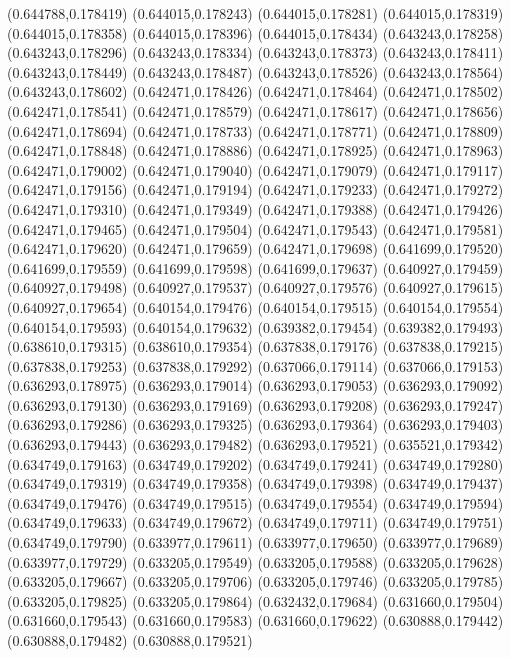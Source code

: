 (0.644788,0.178419)
(0.644015,0.178243)
(0.644015,0.178281)
(0.644015,0.178319)
(0.644015,0.178358)
(0.644015,0.178396)
(0.644015,0.178434)
(0.643243,0.178258)
(0.643243,0.178296)
(0.643243,0.178334)
(0.643243,0.178373)
(0.643243,0.178411)
(0.643243,0.178449)
(0.643243,0.178487)
(0.643243,0.178526)
(0.643243,0.178564)
(0.643243,0.178602)
(0.642471,0.178426)
(0.642471,0.178464)
(0.642471,0.178502)
(0.642471,0.178541)
(0.642471,0.178579)
(0.642471,0.178617)
(0.642471,0.178656)
(0.642471,0.178694)
(0.642471,0.178733)
(0.642471,0.178771)
(0.642471,0.178809)
(0.642471,0.178848)
(0.642471,0.178886)
(0.642471,0.178925)
(0.642471,0.178963)
(0.642471,0.179002)
(0.642471,0.179040)
(0.642471,0.179079)
(0.642471,0.179117)
(0.642471,0.179156)
(0.642471,0.179194)
(0.642471,0.179233)
(0.642471,0.179272)
(0.642471,0.179310)
(0.642471,0.179349)
(0.642471,0.179388)
(0.642471,0.179426)
(0.642471,0.179465)
(0.642471,0.179504)
(0.642471,0.179543)
(0.642471,0.179581)
(0.642471,0.179620)
(0.642471,0.179659)
(0.642471,0.179698)
(0.641699,0.179520)
(0.641699,0.179559)
(0.641699,0.179598)
(0.641699,0.179637)
(0.640927,0.179459)
(0.640927,0.179498)
(0.640927,0.179537)
(0.640927,0.179576)
(0.640927,0.179615)
(0.640927,0.179654)
(0.640154,0.179476)
(0.640154,0.179515)
(0.640154,0.179554)
(0.640154,0.179593)
(0.640154,0.179632)
(0.639382,0.179454)
(0.639382,0.179493)
(0.638610,0.179315)
(0.638610,0.179354)
(0.637838,0.179176)
(0.637838,0.179215)
(0.637838,0.179253)
(0.637838,0.179292)
(0.637066,0.179114)
(0.637066,0.179153)
(0.636293,0.178975)
(0.636293,0.179014)
(0.636293,0.179053)
(0.636293,0.179092)
(0.636293,0.179130)
(0.636293,0.179169)
(0.636293,0.179208)
(0.636293,0.179247)
(0.636293,0.179286)
(0.636293,0.179325)
(0.636293,0.179364)
(0.636293,0.179403)
(0.636293,0.179443)
(0.636293,0.179482)
(0.636293,0.179521)
(0.635521,0.179342)
(0.634749,0.179163)
(0.634749,0.179202)
(0.634749,0.179241)
(0.634749,0.179280)
(0.634749,0.179319)
(0.634749,0.179358)
(0.634749,0.179398)
(0.634749,0.179437)
(0.634749,0.179476)
(0.634749,0.179515)
(0.634749,0.179554)
(0.634749,0.179594)
(0.634749,0.179633)
(0.634749,0.179672)
(0.634749,0.179711)
(0.634749,0.179751)
(0.634749,0.179790)
(0.633977,0.179611)
(0.633977,0.179650)
(0.633977,0.179689)
(0.633977,0.179729)
(0.633205,0.179549)
(0.633205,0.179588)
(0.633205,0.179628)
(0.633205,0.179667)
(0.633205,0.179706)
(0.633205,0.179746)
(0.633205,0.179785)
(0.633205,0.179825)
(0.633205,0.179864)
(0.632432,0.179684)
(0.631660,0.179504)
(0.631660,0.179543)
(0.631660,0.179583)
(0.631660,0.179622)
(0.630888,0.179442)
(0.630888,0.179482)
(0.630888,0.179521)
